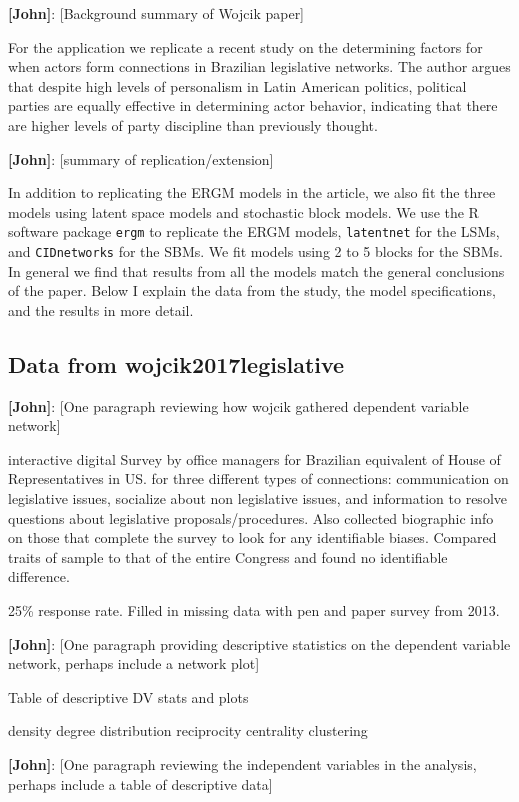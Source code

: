\documentclass[fleqn,12pt]{wlscirep}
\begin{document}
{\bf [John]}: [Background summary of Wojcik paper]

For the application we replicate a recent study on the determining factors for when actors form connections in Brazilian legislative networks. The author argues that despite high levels of personalism in Latin American politics, political parties are equally effective in determining actor behavior, indicating that there are higher levels of party discipline than previously thought.


{\bf [John]}: [summary of replication/extension]

In addition to replicating the ERGM models in the article, we also fit the three models using latent space models and stochastic block models. We use the R software package \texttt{ergm} to replicate the ERGM models, \texttt{latentnet} for the LSMs, and \texttt{CIDnetworks} for the SBMs.  We fit models using 2 to 5 blocks for the SBMs. In general we find that results from all the models match the general conclusions of the paper. Below I explain the data from the study, the model specifications, and the results in more detail.

\subsection{Data from wojcik2017legislative}

{\bf [John]}: [One paragraph reviewing how wojcik gathered dependent variable network] 

interactive digital Survey by office managers for Brazilian equivalent of House of Representatives in US. for three different types of connections: communication on legislative issues, socialize about non legislative issues, and information to resolve questions about legislative proposals/procedures.
Also collected biographic info on those that complete the survey to look for any identifiable biases.  Compared traits of sample to that of the entire Congress and found no identifiable difference.

25\% response rate. Filled in missing data with pen and paper survey from 2013.

{\bf [John]}: [One paragraph providing descriptive statistics on the dependent variable network, perhaps include a network plot]

Table of descriptive DV stats and plots

density
degree distribution
reciprocity
centrality
clustering


 {\bf [John]}: [One paragraph reviewing the independent variables in the analysis, perhaps include a table of descriptive data]
\end{document}
